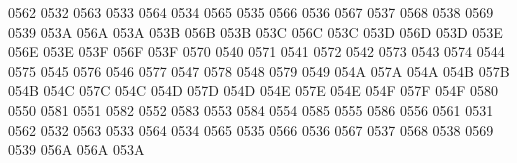  0562 0532 %
 0563 0533 %
 0564 0534 %
 0565 0535 %
 0566 0536 %
 0567 0537 %
 0568 0538 %
 0569 0539 %
\setcclcucx 053A 056A 053A %
\setcclcucx 053B 056B 053B %
\setcclcucx 053C 056C 053C %
\setcclcucx 053D 056D 053D %
\setcclcucx 053E 056E 053E %
\setcclcucx 053F 056F 053F %
 0570 0540 %
 0571 0541 %
 0572 0542 %
 0573 0543 %
 0574 0544 %
 0575 0545 %
 0576 0546 %
 0577 0547 %
 0578 0548 %
 0579 0549 %
\setcclcucx 054A 057A 054A %
\setcclcucx 054B 057B 054B %
\setcclcucx 054C 057C 054C %
\setcclcucx 054D 057D 054D %
\setcclcucx 054E 057E 054E %
\setcclcucx 054F 057F 054F %
 0580 0550 %
 0581 0551 %
 0582 0552 %
 0583 0553 %
 0584 0554 %
 0585 0555 %
 0586 0556 %
 0561 0531 %
 0562 0532 %
 0563 0533 %
 0564 0534 %
 0565 0535 %
 0566 0536 %
 0567 0537 %
 0568 0538 %
 0569 0539 %
\setcclcucx 056A 056A 053A %
